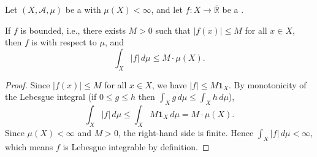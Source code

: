 \begin{proposition} \label{proposition:bounded_measurable_functions_on_finite_measure_spaces_are_lebesgue_integrable}
Let $(X,\mathcal{A},\mu)$ be a  with $\mu(X) < \infty$, and let $f : X \to \overline{\mathbb{R}}$ be a .

If $f$ is bounded, i.e., there exists $M > 0$ such that $|f(x)| \leq M$ for all $x \in X$, then $f$ is  with respect to $\mu$, and
$$\int_X |f|\,d\mu \leq M \cdot \mu(X).$$
\end{proposition}

\begin{proof}
Since $|f(x)| \leq M$ for all $x \in X$, we have $|f| \leq M \mathbf{1}_X$. By monotonicity of the Lebesgue integral (if $0 \leq g \leq h$ then $\int_X g\,d\mu \leq \int_X h\,d\mu$),
$$\int_X |f|\,d\mu \leq \int_X M \mathbf{1}_X\,d\mu = M \cdot \mu(X).$$
Since $\mu(X) < \infty$ and $M > 0$, the right-hand side is finite. Hence $\int_X |f|\,d\mu < \infty$, which means $f$ is Lebesgue integrable by definition.
\end{proof}
